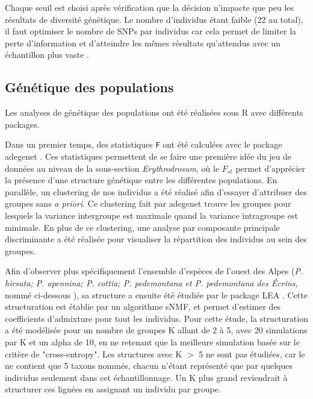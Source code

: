\documentclass[../Master_report2.tex]{subfiles}
\begin{document}
Chaque seuil est choisi après vérification que la décision n'impacte que peu les résultats de diversité génétique.
 Le nombre d'individus étant faible (22 au total), il faut optimiser le nombre de SNPs par individus car cela permet de limiter la perte d'information et d'atteindre les mêmes résultats qu'attendus avec un échantillon plus vaste \citep{Nazareno2017}.


\subsection{Génétique des populations}

Les analyses de génétique des populations ont été réalisées sous R avec différents packages. 

Dans un premier temps, des statistiques \verb|F| ont été calculées avec le package adegenet \citep{Jombart2011}. Ces statistiques permettent de se faire une première idée du jeu de données au niveau de la sous-section \textit{Erythrodrosum}, où le $F_{st}$ permet d'apprécier la présence d'une structure génétique entre les différentes populations.
 En parallèle, un clustering de nos individus a été réalisé afin d'essayer d'attribuer des groupes sans \textit{a priori}. Ce clustering fait par adegenet trouve les groupes pour lesquels la variance intergroupe est maximale quand la variance intragroupe est minimale. En plus de ce clustering, une analyse par composante principale discriminante a été réalisée pour visualiser la répartition des individus au sein des groupes.

Afin d'observer plus spécifiquement l'ensemble d'espèces de l'ouest des Alpes (\textit{P. hirsuta; P. apennina; P. cottia; P. pedemontana et P. pedemontana des Écrins}, nommé ci-dessous ), sa structure a ensuite été étudiée par le package LEA \citep{Frichot2015}. Cette structuration est établie par un algorithme sNMF, et permet d'estimer des coefficients d'admixture pour tout les individus. Pour cette étude, la structuration a été modélisée pour un nombre de groupes K allant de 2 à 5, avec 20 simulations par K et un alpha de 10, en ne retenant que la meilleure simulation basée sur le critère de "cross-entropy". Les structures avec K $>$ 5 ne sont pas étudiées, car le  ne contient que 5 taxons nommés, chacun n'étant représenté que par quelques individus seulement dans cet échantillonnage. Un K plus grand reviendrait à structurer ces lignées en assignant un individu par  groupe.
\end{document}
